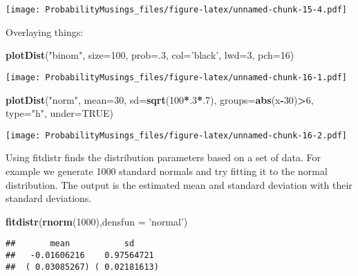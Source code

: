 \documentclass[]{article}
\newenvironment{Shaded}{\begin{snugshade}}{\end{snugshade}}
\newcommand{\KeywordTok}[1]{\textcolor[rgb]{0.13,0.29,0.53}{\textbf{#1}}}
\newcommand{\DataTypeTok}[1]{\textcolor[rgb]{0.13,0.29,0.53}{#1}}
\newcommand{\DecValTok}[1]{\textcolor[rgb]{0.00,0.00,0.81}{#1}}
\newcommand{\StringTok}[1]{\textcolor[rgb]{0.31,0.60,0.02}{#1}}
\newcommand{\OtherTok}[1]{\textcolor[rgb]{0.56,0.35,0.01}{#1}}
\newcommand{\OperatorTok}[1]{\textcolor[rgb]{0.81,0.36,0.00}{\textbf{#1}}}
\newcommand{\NormalTok}[1]{#1}
\begin{document}
\texttt{[image: ProbabilityMusings\_files/figure-latex/unnamed-chunk-15-4.pdf]}

Overlaying things:

\begin{Shaded}
\begin{Highlighting}[]
\KeywordTok{plotDist}\NormalTok{(}\StringTok{"binom"}\NormalTok{, }\DataTypeTok{size=}\DecValTok{100}\NormalTok{, }\DataTypeTok{prob=}\NormalTok{.}\DecValTok{3}\NormalTok{, }\DataTypeTok{col=}\StringTok{'black'}\NormalTok{, }\DataTypeTok{lwd=}\DecValTok{3}\NormalTok{, }\DataTypeTok{pch=}\DecValTok{16}\NormalTok{)}
\end{Highlighting}
\end{Shaded}

\texttt{[image: ProbabilityMusings\_files/figure-latex/unnamed-chunk-16-1.pdf]}

\begin{Shaded}
\begin{Highlighting}[]
\KeywordTok{plotDist}\NormalTok{(}\StringTok{"norm"}\NormalTok{, }\DataTypeTok{mean=}\DecValTok{30}\NormalTok{, }\DataTypeTok{sd=}\KeywordTok{sqrt}\NormalTok{(}\DecValTok{100}\OperatorTok{*}\NormalTok{.}\DecValTok{3}\OperatorTok{*}\NormalTok{.}\DecValTok{7}\NormalTok{), }\DataTypeTok{groups=}\KeywordTok{abs}\NormalTok{(x}\OperatorTok{-}\DecValTok{30}\NormalTok{)}\OperatorTok{>}\DecValTok{6}\NormalTok{, }\DataTypeTok{type=}\StringTok{"h"}\NormalTok{, }\DataTypeTok{under=}\OtherTok{TRUE}\NormalTok{)}
\end{Highlighting}
\end{Shaded}

\texttt{[image: ProbabilityMusings\_files/figure-latex/unnamed-chunk-16-2.pdf]}

Using fitdistr finds the distribution parameters based on a set of data.
For example we generate 1000 standard normals and try fitting it to the
normal distribution. The output is the estimated mean and standard
deviation with their standard deviations.

\begin{Shaded}
\begin{Highlighting}[]
\KeywordTok{fitdistr}\NormalTok{(}\KeywordTok{rnorm}\NormalTok{(}\DecValTok{1000}\NormalTok{),}\DataTypeTok{densfun =} \StringTok{'normal'}\NormalTok{)}
\end{Highlighting}
\end{Shaded}

\begin{verbatim}
##       mean           sd     
##   -0.01606216    0.97564721 
##  ( 0.03085267) ( 0.02181613)
\end{verbatim}
\end{document}
